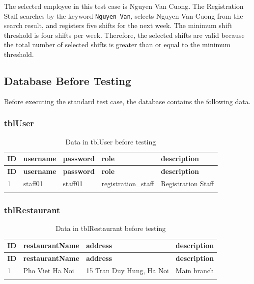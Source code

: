 The selected employee in this test case is Nguyen Van Cuong. The Registration Staff searches by the keyword \texttt{Nguyen Van}, selects Nguyen Van Cuong from the search result, and registers five shifts for the next week. The minimum shift threshold is four shifts per week. Therefore, the selected shifts are valid because the total number of selected shifts is greater than or equal to the minimum threshold.

\subsection{Database Before Testing}

Before executing the standard test case, the database contains the following data.

\subsubsection*{tblUser}

\begin{longtable}{|p{}|p{}|p{}|p{}|p{}|}
\hline
\textbf{ID} & \textbf{username} & \textbf{password} & \textbf{role} & \textbf{description} \\
\hline
\endfirsthead
\hline
\textbf{ID} & \textbf{username} & \textbf{password} & \textbf{role} & \textbf{description} \\
\hline
\endhead
1 & staff01 & staff01 & registration\_staff & Registration Staff \\
\hline
\caption{Data in tblUser before testing}\label{tab:testing-user-before}
\end{longtable}

\subsubsection*{tblRestaurant}

\begin{longtable}{|p{}|p{}|p{}|p{}|}
\hline
\textbf{ID} & \textbf{restaurantName} & \textbf{address} & \textbf{description} \\
\hline
\endfirsthead
\hline
\textbf{ID} & \textbf{restaurantName} & \textbf{address} & \textbf{description} \\
\hline
\endhead
1 & Pho Viet Ha Noi & 15 Tran Duy Hung, Ha Noi & Main branch \\
\hline
\caption{Data in tblRestaurant before testing}\label{tab:testing-restaurant-before}
\end{longtable}

